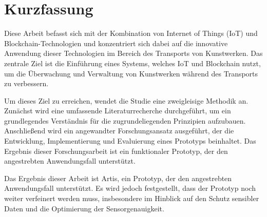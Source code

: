 

\chapter*{Kurzfassung}
Diese Arbeit befasst sich mit der Kombination von Internet of Things (IoT) und Blockchain-Technologien und konzentriert sich dabei auf die innovative Anwendung dieser Technologien im Bereich des Transports von Kunstwerken. Das zentrale Ziel ist die Einführung eines Systems, welches IoT und Blockchain nutzt, um die Überwachung und Verwaltung von Kunstwerken während des Transports zu verbessern.

Um dieses Ziel zu erreichen, wendet die Studie eine zweigleisige Methodik an. Zunächst wird eine umfassende Literaturrecherche durchgeführt, um ein grundlegendes Verständnis für die zugrundeliegenden Prinzipien aufzubauen. Anschließend wird ein angewandter Forschungsansatz ausgeführt, der die Entwicklung, Implementierung und Evaluierung eines Prototyps beinhaltet. Das Ergebnis dieser Forschungsarbeit ist ein funktionaler Prototyp, der den angestrebten Anwendungsfall unterstützt.

Das Ergebnis dieser Arbeit ist Artis, ein Prototyp, der den angestrebten Anwendungsfall unterstützt. Es wird jedoch festgestellt, dass der Prototyp noch weiter verfeinert werden muss, insbesondere im Hinblick auf den Schutz sensibler Daten und die Optimierung der Sensorgenauigkeit.

